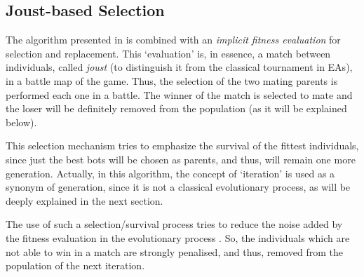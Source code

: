 \documentclass[conference]{IEEEtran}
\begin{document}


\subsection{Joust-based Selection}
The algorithm presented in \cite{GarciaGP14} %
is combined with an \textit{implicit fitness evaluation} for selection and
replacement. This `evaluation' is, in essence, a match between individuals, called {\em joust} (to distinguish it from the classical tournament in EAs), in a battle map of the game.
Thus, the selection of the two mating parents is performed each one in a battle. The winner of the match is selected to mate
and the loser will be definitely removed from the population (as it will be explained below).



This selection mechanism tries to emphasize the survival of the fittest individuals, since just the best bots will be chosen as parents, and thus, will remain one more generation. Actually, in this algorithm, the concept of `iteration' is used as a synonym of generation, since it is not a classical evolutionary process, as will be deeply explained in the next section.

The use of such a selection/survival process tries to reduce the noise added by the fitness evaluation in the evolutionary process \cite{Genebot_JCST}. So, the individuals which are not able to win in a match are strongly penalised, and thus, removed from the population of the next iteration.
\end{document}
